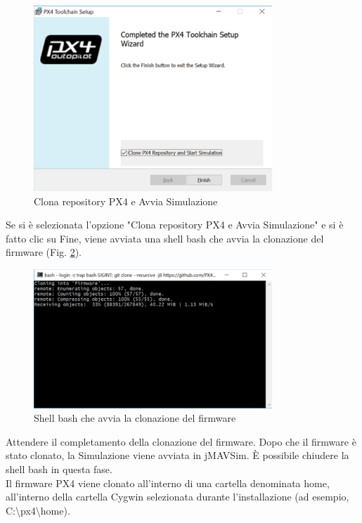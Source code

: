 \begin{figure}[H] %
  \centering
  \includegraphics[width=0.8\textwidth]{files/images/clone_px4.png} %
  \caption{Clona repository PX4 e Avvia Simulazione} %
  \label{fig:Clona repository PX4 e Avvia Simulazione} %
\end{figure}
\noindent
Se si è selezionata l'opzione "Clona repository PX4 e Avvia Simulazione" e si è fatto clic su Fine, viene avviata una shell bash che avvia la clonazione del firmware (Fig. \ref{fig:Shell bash che avvia la clonazione del firmware}).
\begin{figure}[H] %
  \centering
  \includegraphics[width=0.8\textwidth]{files/images/bash_after_installation.png} %
  \caption{Shell bash che avvia la clonazione del firmware} %
  \label{fig:Shell bash che avvia la clonazione del firmware} %
\end{figure}
\noindent
Attendere il completamento della clonazione del firmware. Dopo che il firmware è stato clonato, la Simulazione viene avviata in jMAVSim. È possibile chiudere la shell bash in questa fase.
\\
Il firmware PX4 viene clonato all'interno di una cartella denominata home, all'interno della cartella Cygwin selezionata durante l'installazione (ad esempio, C:\textbackslash{}px4\textbackslash{}home).

